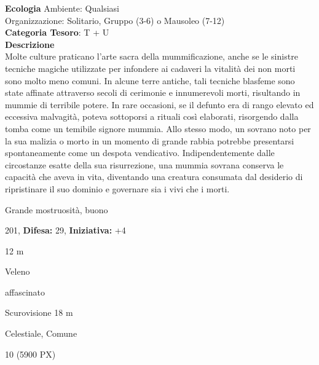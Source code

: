 \begin{multicols}{2}
{\textbf{Ecologia}
Ambiente: Qualsiasi\\
Organizzazione: Solitario, Gruppo (3-6) o Mausoleo (7-12)\\
\textbf{Categoria Tesoro}: T + U\\
\textbf{Descrizione}\\
Molte culture praticano l'arte sacra della mummificazione, anche se le sinistre tecniche magiche utilizzate per infondere ai cadaveri la vitalità dei non morti sono molto meno comuni. In alcune terre antiche, tali tecniche blasfeme sono state affinate attraverso secoli di cerimonie e innumerevoli morti, risultando in mummie di terribile potere. In rare occasioni, se il defunto era di rango elevato ed eccessiva malvagità, poteva sottoporsi a rituali così elaborati, risorgendo dalla tomba come un temibile signore mummia. Allo stesso modo, un sovrano noto per la sua malizia o morto in un momento di grande rabbia potrebbe presentarsi spontaneamente come un despota vendicativo. Indipendentemente dalle circostanze esatte della sua risurrezione, una mummia sovrana conserva le capacità che aveva in vita, diventando una creatura consumata dal desiderio di ripristinare il suo dominio e governare sia i vivi che i morti.


\noindent
\begin{description}[noitemsep, topsep=0pt, parsep=0pt, partopsep=0pt, leftmargin=0cm, labelwidth=2.2cm]
	\item[\textbf{Taglia/Tipo:}] Grande mostruosità, buono
	\item[\textbf{Caratt.:}] 
	\item[\textbf{Punti Ferita:}] 201,  \textbf{Difesa:} 29,  \textbf{Iniziativa:} +4
	\item[\textbf{Movimento:}] 12 m
	\item[\textbf{Tiri Salvez.:}] 
	\item[\textbf{Imm. Danni:}] Veleno
	\item[\textbf{Immunità:}] affascinato
	\item[\textbf{Sensi:}] Scurovisione 18 m
	\item[\textbf{Linguaggi:}] Celestiale, Comune
	\item[\textbf{Sfida:}] 10 (5900 PX)\smallskip
\end{description}

}
\end{multicols}
